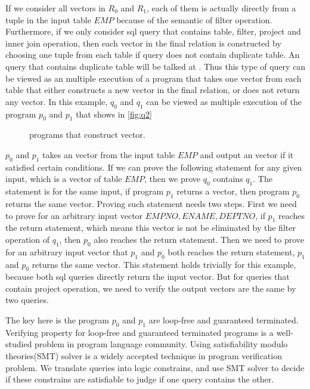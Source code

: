 If we consider all vectors in $R_0$ and $R_1$, each of them is actually directly from a tuple in the input table $EMP$
because of the semantic of filter operation.
%
Furthermore, if we only consider sql query that contains table, filter, project and inner join operation, 
then each vector in the final relation is constructed by choosing one tuple
from each table if query does not contain duplicate table.
%
An query that contains duplicate table will be talked at .
%
Thus this type of query can be viewed as an multiple execution of a program that takes one vector
from each table that either constructs a new vector in the final relation, or does not return any vector.
%
In this example, $q_0$ and $q_1$ can be viewed as multiple execution of the program $p_0$ and $p_1$ that shows in \autoref{fig:q2}
%
\begin{figure}

\caption{%
    programs that construct vector.
  }\label{fig:q2}
\end{figure}
%
$p_0$ and $p_1$ takes an vector from the input table $EMP$ and output an vector if it satisfied certain conditions.
%
If we can prove the following statement for any given input, which is a vector of table $EMP$, then we prove $q_0$ contains $q_1$.
%
The statement is for the same input, if program $p_1$ returns a vector, then program $p_0$ returns the same vector.
%
Proving such statement needs two steps.
%
First we need to prove for an arbitrary input vector $EMPNO,ENAME,DEPTNO$, if $p_1$ reaches the return statement, which means this vector is not be
eliminated by the filter operation of $q_1$, then $p_0$ also reaches the return statement.
%
Then we need to prove for an arbitrary input vector that $p_1$ and $p_0$ both reaches the return statement, $p_1$ and $p_0$ returns the same vector.
%
This statement holds trivially for this example, because both sql queries directly return the input vector.
%
But for queries that contain project operation, we need to verify the output vectors are the same by two queries.

The key here is the program $p_0$ and $p_1$ are loop-free and guaranteed terminated.
%
Verifying property for loop-free and guaranteed terminated programs is a well-studied problem in program language community.
%
Using satisfiability modulo theories(SMT) solver is a widely accepted technique in program verification problem.
%
We translate queries into logic constrains, and use SMT solver to decide if these constrains are satisfiable to judge if one query contains
the other.

